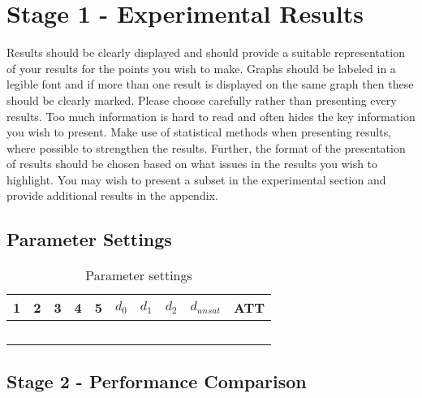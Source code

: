 \section{Stage 1 - Experimental Results}

Results should be clearly displayed and should provide a suitable representation of your results for the points you wish to make. Graphs should be labeled in a legible font and if more than one result is displayed on the same graph then these should be clearly marked.   Please choose carefully rather than presenting every results. Too much information is hard to read and often hides the key information you wish to present. Make use of statistical methods when presenting results, where possible to strengthen the results.  Further, the format of the presentation of results should be chosen based on what issues in the results you wish to highlight. You may wish to present a subset in the experimental section and provide additional results in the appendix.


\subsection{Parameter Settings}

\begin{table}[H]
\centering
    \begin{tabular}{|l|l|l|l|l||l|l|l|l|l|}

 	\hline
 	1 & 2 & 3 & 4 & 5 & $d_0$ & $d_1$ & $d_2$ & $d_{unsat}$ & ATT \\
 	\hline
    ~ & ~ & ~ & ~ & ~ & ~ & ~ & ~ & ~ & ~ \\

	\hline
    \end{tabular}
    \caption {Parameter settings}
    \label{table:parameterSettings}

\end{table}

\subsection{Stage 2 - Performance Comparison}